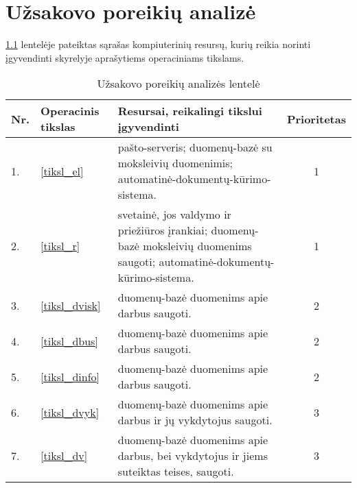 \chapter{Užsakovo poreikių analizė}


\ref{tab:poreikiai} lentelėje pateiktas sąrašas kompiuterinių resursų, 
kurių reikia norinti įgyvendinti \emph{}
skyrelyje aprašytiems operaciniams tikslams.

\begin{table}
  \centering
  \begin{tabular}[]{| l | p{1.6cm} | p{5.8cm} | c |}
    \hline
    Nr. & Operacinis tikslas & Resursai, reikalingi tikslui įgyvendinti &
    Prioritetas \\
    \hline
    1. & \ref{tiksl_el} & 
      \Gls{pašto-serveris}; \gls{duomenų-bazė} su moksleivių duomenimis; 
      \gls{automatinė-dokumentų-kūrimo-sistema}. & 1 \\
    \hline
    2. & \ref{tiksl_r} & 
      \Gls{svetainė}, jos valdymo ir priežiūros įrankiai; 
      \gls{duomenų-bazė} moksleivių duomenims saugoti; 
      \gls{automatinė-dokumentų-kūrimo-sistema}. & 1 \\
    \hline
    3. & \ref{tiksl_dvisk} &
      \Gls{duomenų-bazė} duomenims apie darbus saugoti. & 2 \\
    \hline
    4. & \ref{tiksl_dbus} &
      \Gls{duomenų-bazė} duomenims apie darbus saugoti. & 2 \\
    \hline
    5. & \ref{tiksl_dinfo} &
      \Gls{duomenų-bazė} duomenims apie darbus saugoti. & 2 \\
    \hline
    6. & \ref{tiksl_dvyk} &
      \Gls{duomenų-bazė} duomenims apie darbus ir jų vykdytojus 
      saugoti. & 3 \\
    \hline
    7. & \ref{tiksl_dv} &
      \Gls{duomenų-bazė} duomenims apie darbus, bei vykdytojus ir 
      jiems suteiktas teises, saugoti. & 3 \\
    \hline
  \end{tabular}
  \caption{Užsakovo poreikių analizės lentelė}
  \label{tab:poreikiai}
\end{table}
